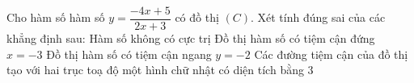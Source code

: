 \begin{ex}
	Cho hàm số hàm số $y=\dfrac{-4x+5}{2x+3}$ có đồ thị $(C)$.
	Xét tính đúng sai của các khẳng định sau:
	\choiceTF
	{\True Hàm số không có cực trị}
	{Đồ thị hàm số có tiệm cận đứng $x=-3$}
	{Đồ thị hàm số có tiệm cận ngang $y=-2$}
	{\True Các đường tiệm cận của đồ thị tạo với hai trục toạ độ một hình chữ nhật có diện tích bằng $3$}
\end{ex}


